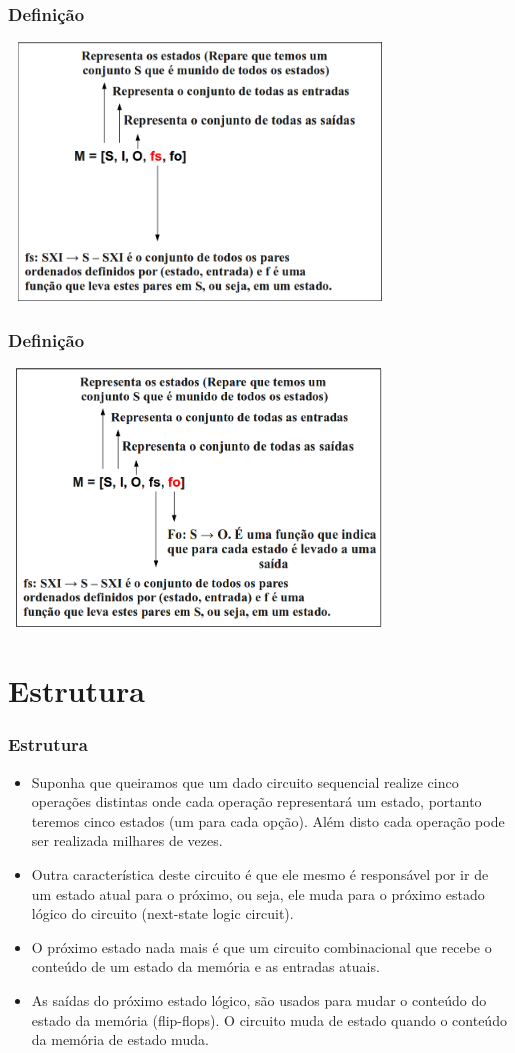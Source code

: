 \documentclass{beamer}
\begin{document}
  \begin{frame}
   \frametitle{Definição}
       \includegraphics[height=2.7in, width=4in]{entendendo_definicao_5.png}
  \end{frame}

  \begin{frame}
   \frametitle{Definição}
       \includegraphics[height=2.7in, width=4in]{entendendo_definicao_6.png}
  \end{frame}

\section{Estrutura}
  \begin{frame}
    \frametitle{Estrutura}
    \begin{itemize}
      \item Suponha que queiramos que um dado circuito sequencial realize cinco operações distintas onde cada operação representará um estado, 
	    portanto teremos cinco estados (um para cada opção). Além disto cada operação pode ser realizada milhares de vezes. \pause
      \item Outra característica deste circuito é que ele mesmo é responsável por ir de um estado atual para o próximo, ou seja, ele muda para 
	    o próximo estado lógico do circuito (next-state logic circuit).\pause
      \item O próximo estado nada mais é que um circuito combinacional que recebe o conteúdo de um estado da memória e as entradas atuais.\pause
      \item As saídas do próximo estado lógico, são usados para mudar o conteúdo do estado da memória (flip-flops). O circuito muda de estado quando 
	    o conteúdo da memória de estado muda.
    \end{itemize}
 \end{frame}
\end{document}
